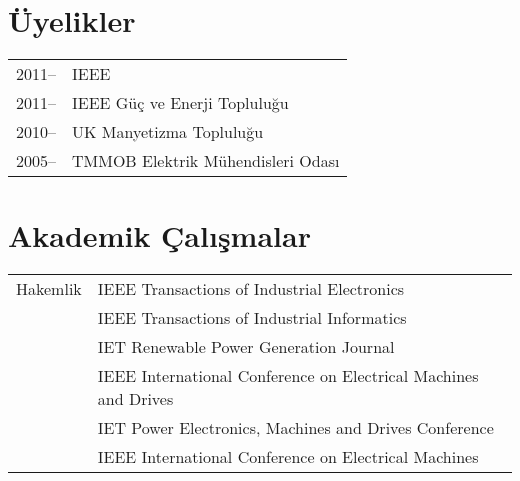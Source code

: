 \documentclass[a4paper,12pt]{article}
\begin{document}


\section{Üyelikler}
\begin{tabular}{ll}
2011-- & IEEE\\
2011-- & IEEE Güç ve Enerji Topluluğu\\
2010-- & UK Manyetizma Topluluğu\\
2005-- & TMMOB Elektrik Mühendisleri Odası\\
\end{tabular}

\section{Akademik Çalışmalar}
\begin{tabular}{ll}
Hakemlik & IEEE Transactions of Industrial Electronics \\
& IEEE Transactions of Industrial Informatics \\
& IET Renewable Power Generation Journal \\
& IEEE International Conference on Electrical Machines and Drives \\
& IET Power Electronics, Machines and Drives Conference \\
& IEEE International Conference on Electrical Machines\\
\end{tabular}
\end{document}

